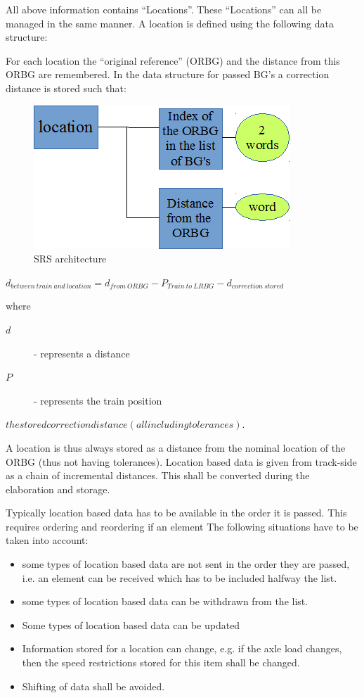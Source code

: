 \documentclass{template/openetcs_report}
\begin{document}
All above information contains “Locations”. These “Locations” can all be managed in the same manner. A location is defined using the following data structure:

For each location the “original reference” (ORBG) and the distance from this ORBG are remembered. 
In the data structure for passed BG's a correction distance is stored such that:

\begin{figure}[hbtp]
\centering
\includegraphics[angle=0, scale=0.9] {images/ORBG.png}
\caption{SRS architecture}
\end{figure}


$d_{ between~train~and~location} =
d_{from~ORBG} - P_{Train~to~ LRBG}  -  d_{correction~stored}$


where
\begin{description}
   \item[$d$] - represents a distance
   \item[$P$] - represents the train position
\end{description}
$the stored correction distance (all including tolerances)$.

A location is thus always stored as a distance from the nominal location of the ORBG (thus not having tolerances). Location based data is given from track-side as a chain of incremental distances. This shall be converted during the elaboration and storage.

Typically location based data has to be available in the order it is passed. This requires ordering and reordering if an element The following situations have to be taken into account:
\begin{itemize}
\item some types of location based data are not sent in the order they are passed, i.e. an element can be received which has to be included halfway the list.
\item some types of location based data can be withdrawn from the list.
\item Some types of location based data can be updated
\item Information stored for a location can change, e.g. if the axle load changes, then the speed restrictions stored for this item shall be changed.
\item Shifting of data shall be avoided.
\end{itemize}
\end{document}
